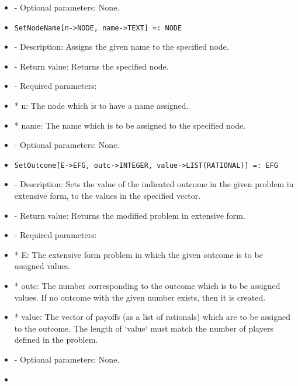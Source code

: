 \begin{itemize}
\item
- Optional parameters:  None.
\ed

\item

\begin{verbatim}
SetNodeName[n->NODE, name->TEXT] =: NODE
\end{verbatim}

\bd
\item
- Description:  Assigns the given name to the specified node.
\item
- Return value:  Returns the specified node.
\item
- Required parameters:
	
\bd
\item
*  n:  The node which is to have a name assigned.
\item
*  name:  The name which is to be assigned to the specified node.
\ed

\item
- Optional parameters:  None.
\ed

\item
\begin{verbatim}
SetOutcome[E->EFG, outc->INTEGER, value->LIST(RATIONAL)] =: EFG
\end{verbatim}
   
\bd
\item
- Description:  Sets the value of the indicated outcome in the given 
problem in extensive form, to the values in the specified vector.
\item
- Return value:  Returns the modified problem in extensive form. 
\item
- Required parameters:
	
\bd
\item
*  E:  The extensive form problem in which the given outcome is to be
assigned values.
\item

*  outc:  The number corresponding to the outcome which is to be 
assigned values.  If no outcome with the given number exists,
then it is created.
\item
*  value:  The vector of payoffs (as a list of rationals) which are 
to be assigned to the outcome.  The length of `value` must 
match the number of players defined in the problem.
\ed

\item
- Optional parameters:  None.
\ed

\item


\end{itemize}

